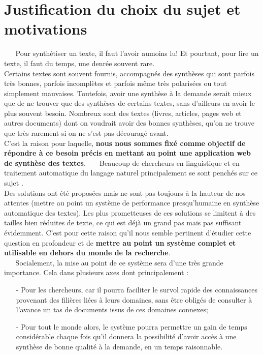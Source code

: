 \section{Justification du choix du sujet et motivations}
$ _{} $ $ _{} $ $ _{} $ $ _{} $ $ _{} $Pour synthétiser un texte, il faut l'avoir aumoins lu! Et pourtant, pour lire un texte, il faut du temps, une denrée souvent rare.\\
Certains textes sont souvent fournis, accompagnés des synthèses qui sont parfois très bonnes, parfois incomplètes et parfois même très polarisées ou tout simplement mauvaises.
Toutefois, avoir une synthèse à la demande serait mieux que de ne trouver que des synthèses de certains textes, sans d'ailleurs en avoir le plus souvent besoin. Nombreux sont des textes (livres, articles, pages web et autres documents) dont on voudrait avoir des bonnes synthèses, qu'on ne trouve que très rarement si on ne s'est pas découragé avant.\\
C'est la raison pour laquelle, \textbf{nous nous sommes fixé comme objectif de répondre à ce besoin précis en mettant au point une application web de synthèse des textes}.
$ _{} $ $ _{} $ $ _{} $ $ _{} $ $ _{} $Beaucoup de chercheurs en linguistique et en traitement automatique du langage naturel principalement se sont penchés sur ce sujet \cite{lamsiyah-etal-2018-resume,torres2014automatic,adams2021combining,beaucoup_de_chercheurs2,beaucoup_de_chercheurs3}.\\
Des solutions ont été proposées mais ne sont pas toujours à la hauteur de nos attentes (mettre au point un système de performance presqu'humaine en synthèse automatique des textes). Les plus prometteuses de ces solutions se limitent à des tailles bien réduites de texte, ce qui est déjà un grand pas mais pas suffisant évidemment. C'est pour cette raison qu'il nous semble pertinent d'étudier cette question en profondeur et de \textbf{mettre au point un système complet et utilisable en dehors du monde de la recherche}.\\
$ _{} $ $ _{} $ $ _{} $ $ _{} $ $ _{} $Socialement, la mise au point de ce système sera d'une très grande importance. Cela dans plusieurs axes dont principalement :
\begin{itemize}
\item[-] Pour les chercheurs, car il pourra faciliter le survol rapide des connaissances provenant des filières liées à leurs domaines, sans être obligés de consulter à l'avance un tas de documents issus de ces domaines connexes;
\item[-] Pour tout le monde alors, le système pourra permettre un gain de temps considérable chaque fois qu'il donnera la possibilité d'avoir accès à une synthèse de bonne qualité à la demande, en un temps raisonnable.
\end{itemize}
